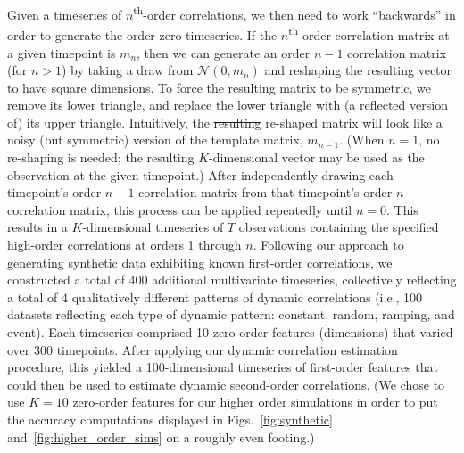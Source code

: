 \documentclass[english]{article}
\providecommand{\DIFdeltex}[1]{{\protect\color{red}\sout{#1}}}                      %
\providecommand{\DIFdelbegin}{} %
\providecommand{\DIFdelend}{} %
\providecommand{\DIFdel}[1]{\texorpdfstring{\DIFdeltex{#1}}{}} %
\newcommand{\DIFscaledelfig}{0.5}
\newlength{\DIFdelgraphicswidth} %
\newlength{\DIFdelgraphicsheight} %
\newcommand{\DIFdelincludegraphics}[2][]{%
\sbox{\DIFdelgraphicsbox}{\DIFOincludegraphics[#1]{#2}}%
\settoboxwidth{\DIFdelgraphicswidth}{\DIFdelgraphicsbox} %
\settoboxtotalheight{\DIFdelgraphicsheight}{\DIFdelgraphicsbox} %
\scalebox{\DIFscaledelfig}{%
\parbox[b]{\DIFdelgraphicswidth}{\usebox{\DIFdelgraphicsbox}\\[-\baselineskip] \rule{\DIFdelgraphicswidth}{0em}}\llap{\resizebox{\DIFdelgraphicswidth}{\DIFdelgraphicsheight}{%
\setlength{\unitlength}{\DIFdelgraphicswidth}%
\begin{picture}(1,1)%
\thicklines\linethickness{2pt} %
{\color[rgb]{1,0,0}\put(0,0){\framebox(1,1){}}}%
{\color[rgb]{1,0,0}\put(0,0){\line( 1,1){1}}}%
{\color[rgb]{1,0,0}\put(0,1){\line(1,-1){1}}}%
\end{picture}%
}\hspace*{3pt}}} %
} %
\DeclareRobustCommand{\DIFdelbegin}{\DIFOdelbegin \let\includegraphics\DIFdelincludegraphics} %
\DeclareRobustCommand{\DIFdelend}{\DIFOaddend \let\includegraphics\DIFOincludegraphics} %
\begin{document}
Given a timeseries of $n$\textsuperscript{th}-order correlations, we
then need to work ``backwards'' in order to generate the order-zero
timeseries.  If the $n$\textsuperscript{th}-order correlation matrix
at a given timepoint is $m_n$, then we can generate an order $n-1$
correlation matrix (for $n > 1$) by taking a draw from
$\mathcal{N}\left(0, m_n\right)$ and reshaping the resulting vector to
have square dimensions.  To force the resulting matrix to be
symmetric, we remove its lower triangle, and replace the lower
triangle with (a reflected version
of) its upper triangle. Intuitively, the \DIFdelbegin \DIFdel{resulting }\DIFdelend re-shaped matrix will look
like a noisy (but symmetric) version of the template matrix, $m_{n-1}$.  (When
$n = 1$, no re-shaping is needed; the resulting $K$-dimensional vector
may be used as the observation at the given timepoint.)  After
independently drawing each timepoint's order $n-1$ correlation matrix
from that timepoint's order $n$ correlation matrix, this process can
be applied repeatedly until $n = 0$.  This results in a
$K$-dimensional timeseries of $T$ observations containing the
specified high-order correlations at orders 1 through $n$.  Following
our approach to generating synthetic data exhibiting known first-order
correlations, we constructed a total of 400 additional multivariate
timeseries, collectively reflecting a total of 4 qualitatively
different patterns of dynamic correlations (i.e., 100 datasets
reflecting each type of dynamic pattern: constant, random, ramping,
and event).   Each timeseries comprised 10 zero-order features (dimensions)
that varied over 300 timepoints.  After applying our dynamic
correlation estimation procedure, this yielded a 100-dimensional
timeseries of first-order
features that could then be used to estimate dynamic second-order
correlations.  (We chose to use $K=10$ zero-order features for our
higher order simulations in order to put the accuracy computations
displayed in Figs.~\ref{fig:synthetic} and~\ref{fig:higher_order_sims}
on a roughly even footing.)

 
\end{document}
